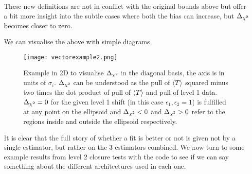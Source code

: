 These new definitions are not in conflict with the original bounds above but
offer a bit more insight into the subtle cases where both the bias can increase,
but $\Delta_{\chi^{2}}$ becomes closer to zero.

We can visualise the above with simple diagrams
%
\begin{figure}[!h]
    \centering
    \texttt{[image: vectorexample2.png]}
    \caption{\small Example in 2D to visualise $\Delta_{\chi^{2}}$ in the diagonal basis, the
    axis is in units of $\sigma_{i}$. $\Delta_{\chi^{2}}$ can be understood as the pull of
    $\langle T \rangle$ squared minus two times the dot product of pull of $\langle T \rangle$ and pull of
    level 1 data. $\Delta_{\chi^{2}} = 0$ for the given level 1 shift (in this case
    $\epsilon_1, \epsilon_2 = 1$) is fulfilled at any point on the ellipsoid and
    $\Delta_{\chi^{2}}<0$ and $\Delta_{\chi^{2}}>0$ refer to the regions inside and outside the ellipsoid
    respectively.}
    \label{fig:vectorexample}
\end{figure}
%
It is clear that the full story of whether a fit is better or not is given not
by a single estimator, but rather on the 3 estimators combined. We now turn to
some example results from level 2 closure tests with the \nfit code to see if we
can say something about the different architectures used in each one.

